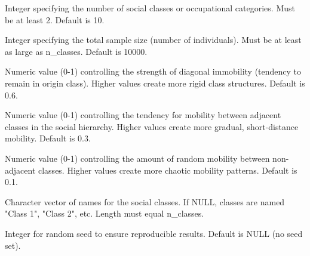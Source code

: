 \documentclass[a4paper]{book}
\begin{document}
\begin{Arguments}
\begin{ldescription}
\item[\code{n\_classes}] Integer specifying the number of social classes or occupational
categories. Must be at least 2. Default is 10.

\item[\code{n\_total}] Integer specifying the total sample size (number of individuals).
Must be at least as large as n\_classes. Default is 10000.

\item[\code{immobility\_strength}] Numeric value (0-1) controlling the strength of
diagonal immobility (tendency to remain in origin class). Higher values create
more rigid class structures. Default is 0.6.

\item[\code{class\_clustering}] Numeric value (0-1) controlling the tendency for mobility
between adjacent classes in the social hierarchy. Higher values create more
gradual, short-distance mobility. Default is 0.3.

\item[\code{noise\_level}] Numeric value (0-1) controlling the amount of random mobility
between non-adjacent classes. Higher values create more chaotic mobility patterns.
Default is 0.1.

\item[\code{class\_names}] Character vector of names for the social classes. If NULL,
classes are named "Class 1", "Class 2", etc. Length must equal n\_classes.

\item[\code{seed}] Integer for random seed to ensure reproducible results. Default is NULL
(no seed set).
\end{ldescription}
\end{Arguments}
%
\end{document}
